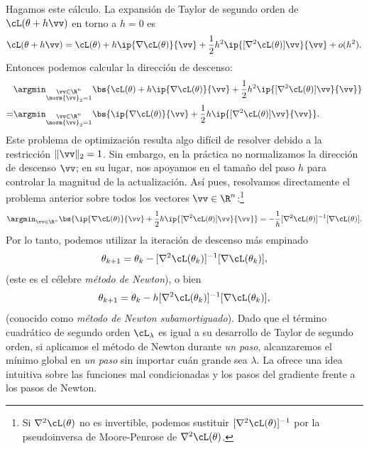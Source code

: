 \documentclass[../../book-main_es.tex]{subfiles}
\begin{document}
Hagamos este cálculo. La expansión de Taylor de segundo orden
de \(\cL(\theta + h\vv)\) en torno a \(h = 0\) es
\begin{equation}
    \cL(\theta + h\vv) = \cL(\theta) + h\ip{\nabla \cL(\theta)}{\vv}
    + \frac{1}{2}h^{2}\ip{[\nabla^{2}\cL(\theta)]\vv}{\vv} + o(h^{2}).
\end{equation}
Entonces podemos calcular la dirección de descenso:
\begin{align}
    & \argmin_{\substack{\vv \in \R^{n} \\ \norm{\vv}_{2} =
    1}}\bs{\cL(\theta) + h\ip{\nabla \cL(\theta)}{\vv} +
    \frac{1}{2}h^{2}\ip{[\nabla^{2}\cL(\theta)]\vv}{\vv}} \\
    = &\argmin_{\substack{\vv \in \R^{n} \\ \norm{\vv}_{2} =
    1}}\bs{\ip{\nabla \cL(\theta)}{\vv} +
    \frac{1}{2}h\ip{[\nabla^{2}\cL(\theta)]\vv}{\vv}}.
\end{align}
Este problema de optimización resulta algo difícil de resolver debido a 
la restricción \(\|\vv\|_2 = 1\). Sin embargo, en la práctica no 
normalizamos la dirección de descenso \(\vv\); en su lugar, nos apoyamos en 
el tamaño del paso \(h\) para controlar la magnitud de la actualización. 
Así pues, resolvamos directamente el problema anterior 
sobre todos los vectores \(\vv \in \R^{n}\):\footnote{Si 
    \(\nabla^{2}\cL(\theta)\) no es invertible, podemos sustituir 
    \([\nabla^{2}\cL(\theta)]^{-1}\) por la pseudoinversa de Moore-Penrose 
de \(\nabla^{2}\cL(\theta)\).}
\begin{equation}
    \argmin_{\vv \in \R^{n}}\bs{\ip{\nabla \cL(\theta)}{\vv} +
    \frac{1}{2}h\ip{[\nabla^{2}\cL(\theta)]\vv}{\vv}} =
    -\frac{1}{h}[\nabla^{2}\cL(\theta)]^{-1}[\nabla \cL(\theta)].
\end{equation}
Por lo tanto, podemos utilizar la iteración de descenso más empinado
\begin{equation}
    \theta_{k + 1} = \theta_{k} -
    [\nabla^{2}\cL(\theta_{k})]^{-1}[\nabla \cL(\theta_{k})],
\end{equation}
(este es el célebre \textit{método de Newton}), o bien
\begin{equation}
    \theta_{k + 1} = \theta_{k} -
    h[\nabla^{2}\cL(\theta_{k})]^{-1}[\nabla \cL(\theta_{k})],
\end{equation}
(conocido como \textit{método de Newton subamortiguado}). Dado que
el término cuadrático de segundo orden \(\cL_{\lambda}\) es igual a su desarrollo de Taylor de segundo orden, 
si aplicamos el método de Newton durante \textit{un paso},
alcanzaremos el mínimo global en \textit{un paso} sin importar cuán
grande sea \(\lambda\). La  ofrece una
idea intuitiva sobre las funciones mal condicionadas y los pasos del gradiente
frente a los pasos de Newton.
\end{document}
